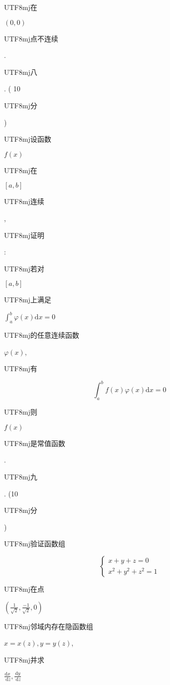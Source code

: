 \documentclass[10pt]{article}
\begin{document}
\begin{CJK}{UTF8}{mj}在\end{CJK} $(0,0)$ \begin{CJK}{UTF8}{mj}点不连续\end{CJK}. \begin{CJK}{UTF8}{mj}八\end{CJK}. ( 10 \begin{CJK}{UTF8}{mj}分\end{CJK}) \begin{CJK}{UTF8}{mj}设函数\end{CJK} $f(x)$ \begin{CJK}{UTF8}{mj}在\end{CJK} $[a, b]$ \begin{CJK}{UTF8}{mj}连续\end{CJK}, \begin{CJK}{UTF8}{mj}证明\end{CJK}: \begin{CJK}{UTF8}{mj}若对\end{CJK} $[a, b]$ \begin{CJK}{UTF8}{mj}上满足\end{CJK} $\int_{a}^{b} \varphi(x) \mathrm{d} x=0$ \begin{CJK}{UTF8}{mj}的任意连续函数\end{CJK} $\varphi(x)$, \begin{CJK}{UTF8}{mj}有\end{CJK}
$$
\int_{a}^{b} f(x) \varphi(x) \mathrm{d} x=0
$$
\begin{CJK}{UTF8}{mj}则\end{CJK} $f(x)$ \begin{CJK}{UTF8}{mj}是常值函数\end{CJK}.

\begin{CJK}{UTF8}{mj}九\end{CJK}. (10 \begin{CJK}{UTF8}{mj}分\end{CJK}) \begin{CJK}{UTF8}{mj}验证函数组\end{CJK}
$$
\left\{\begin{array}{l}
x+y+z=0 \\
x^{2}+y^{2}+z^{2}=1
\end{array}\right.
$$
\begin{CJK}{UTF8}{mj}在点\end{CJK} $\left(\frac{1}{\sqrt{2}}, \frac{-1}{\sqrt{2}}, 0\right)$ \begin{CJK}{UTF8}{mj}邻域内存在隐函数组\end{CJK} $x=x(z), y=y(z)$, \begin{CJK}{UTF8}{mj}并求\end{CJK} $\frac{\mathrm{d} x}{\mathrm{~d} z}, \frac{\mathrm{d} y}{\mathrm{~d} z}$
\end{document}
